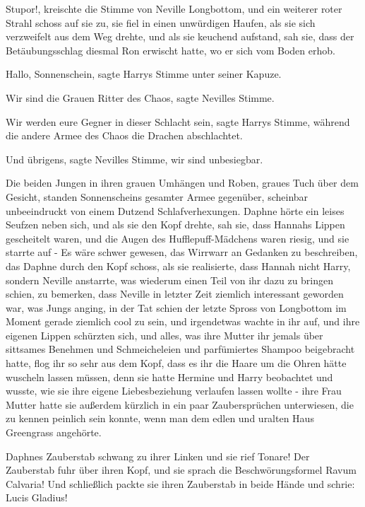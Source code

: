 \glqq Stupor!\grqq{}, kreischte die Stimme von Neville Longbottom, und ein
weiterer roter Strahl schoss auf sie zu, sie fiel in einen unwürdigen Haufen,
als sie sich verzweifelt aus dem Weg drehte, und als sie keuchend aufstand, sah
sie, dass der Betäubungsschlag diesmal Ron erwischt hatte, wo er sich vom Boden
erhob.

\glqq Hallo, Sonnenschein\grqq{}, sagte Harrys Stimme unter seiner Kapuze.

\glqq Wir sind die Grauen Ritter des Chaos\grqq{}, sagte Nevilles Stimme.

\glqq Wir werden eure Gegner in dieser Schlacht sein\grqq{}, sagte Harrys
Stimme, \glqq während die andere Armee des Chaos die Drachen
abschlachtet.\grqq{}

\glqq Und übrigens\grqq{}, sagte Nevilles Stimme, \glqq wir sind
unbesiegbar.\grqq{}

Die beiden Jungen in ihren grauen Umhängen und Roben, graues Tuch über dem
Gesicht, standen Sonnenscheins gesamter Armee gegenüber, scheinbar unbeeindruckt
von einem Dutzend Schlafverhexungen. Daphne hörte ein leises Seufzen neben sich,
und als sie den Kopf drehte, sah sie, dass Hannahs Lippen gescheitelt waren, und
die Augen des Hufflepuff-Mädchens waren riesig, und sie starrte auf - Es wäre
schwer gewesen, das Wirrwarr an Gedanken zu beschreiben, das Daphne durch den
Kopf schoss, als sie realisierte, dass Hannah nicht Harry, sondern Neville
anstarrte, was wiederum einen Teil von ihr dazu zu bringen schien, zu bemerken,
dass Neville in letzter Zeit ziemlich interessant geworden war, was Jungs
anging, in der Tat schien der letzte Spross von Longbottom im Moment gerade
ziemlich cool zu sein, und irgendetwas wachte in ihr auf, und ihre eigenen
Lippen schürzten sich, und alles, was ihre Mutter ihr jemals über sittsames
Benehmen und Schmeicheleien und parfümiertes Shampoo beigebracht hatte, flog ihr
so sehr aus dem Kopf, dass es ihr die Haare um die Ohren hätte wuscheln lassen
müssen, denn sie hatte Hermine und Harry beobachtet und wusste, wie sie ihre
eigene Liebesbeziehung verlaufen lassen wollte - ihre Frau Mutter hatte sie
außerdem kürzlich in ein paar Zaubersprüchen unterwiesen, die zu kennen peinlich
sein konnte, wenn man dem edlen und uralten Haus Greengrass angehörte.

Daphnes Zauberstab schwang zu ihrer Linken und sie rief \glqq Tonare!\grqq{} Der
Zauberstab fuhr über ihren Kopf, und sie sprach die Beschwörungsformel \glqq
Ravum Calvaria!\grqq{} Und schließlich packte sie ihren Zauberstab in beide
Hände und schrie: \glqq Lucis Gladius!\grqq{}

